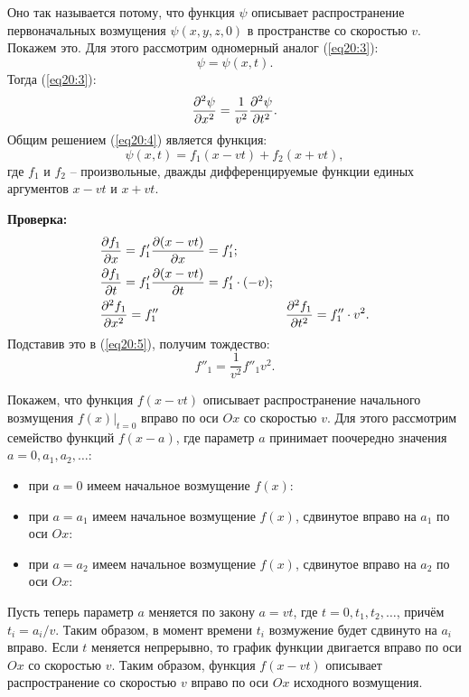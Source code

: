 	Оно так называется потому, что функция \( \psi \) описывает распространение
    первоначальных возмущения \( \psi(x, y, z, 0) \) в пространстве со скоростью
    \( v \). Покажем это. Для этого рассмотрим одномерный аналог (\ref{eq20:3}):
	\[
        \psi = \psi(x, t).
    \]
	Тогда (\ref{eq20:3}):
	\begin{equation}
		\frac{\partial^2 \psi}{\partial x^2} = \frac{1}{v^2}\frac{\partial^2 \psi}{\partial t^2}.
        \label{eq20:4}
	\end{equation}
	Общим решением (\ref{eq20:4}) является функция:
	\begin{equation}
		\psi(x, t) = f_1(x - vt) + f_2(x + vt),
        \label{eq20:5}
	\end{equation}
	где \( f_1 \) и \( f_2 \) -- произвольные, дважды дифференцируемые функции
    единых аргументов \( x - vt \) и \( x + vt \).
	
	\textbf{Проверка:}
    \begin{align*}
        & \frac{\partial f_1}{\partial x} = f'_1\frac{\partial (x-vt)}{\partial x} = f'_1; \\
        & \frac{\partial f_1}{\partial t} = f'_1\frac{\partial (x-vt)}{\partial t} = f'_1\cdot(-v); \\
        & \frac{\partial^2 f_1}{\partial x^2} = f''_1 & \frac{\partial^2 f_1}{\partial t^2} = f''_1\cdot v^2.
	\end{align*}
	Подставив это в (\ref{eq20:5}), получим тождество:
	\[
        f''_1 = \frac{1}{v^2}f''_1v^2.
    \]
	
	Покажем, что функция \( f(x - vt) \) описывает распространение начального
    возмущения \( \left.f(x)\right|_{t = 0} \) вправо по оси \( Ox \) со
    скоростью \( v \). Для этого рассмотрим семейство функций \( f(x - a) \),
    где параметр \( a \) принимает поочередно значения \( a = 0, a_1, a_2,
    \ldots \):
    \begin{itemize}
        \item при \( a = 0 \) имеем начальное возмущение \( f(x) \):
        \item при \( a = a_1 \) имеем начальное возмущение \( f(x) \), сдвинутое
            вправо на \( a_1 \) по оси \( Ox \):
        \item при \( a = a_2 \) имеем начальное возмущение \( f(x) \), сдвинутое
            вправо на \( a_2 \) по оси \( Ox \):
    \end{itemize}
	
	Пусть теперь параметр \( a \) меняется по закону \( a = vt \), где \( t = 0,
    t_1, t_2, \ldots \), причём \( t_i = a_i/v \). Таким образом, в момент
    времени \( t_i \) возмужение будет сдвинуто на \( a_i \) вправо. Если
    \( t \) меняется непрерывно, то график функции двигается вправо по оси
    \( Ox \) со скоростью \( v \). Таким образом, функция \( f(x - vt) \)
    описывает распространение со скоростью \( v \) вправо по оси \( Ox \)
    исходного возмущения.
	
